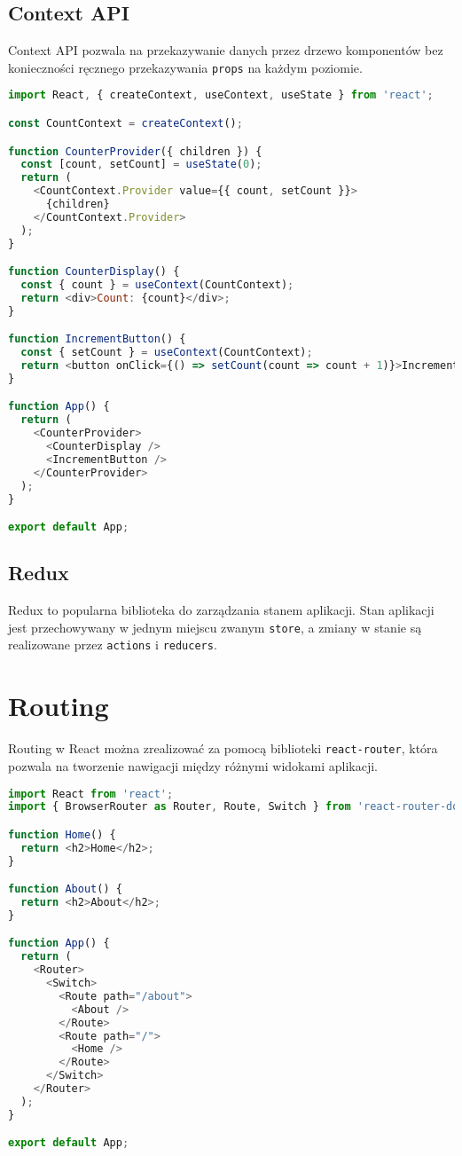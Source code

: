 \documentclass[a4paper,12pt]{article}
\begin{document}
\subsection{Context API}
Context API pozwala na przekazywanie danych przez drzewo komponentów bez konieczności ręcznego przekazywania \texttt{props} na każdym poziomie.

\begin{lstlisting}[language=JavaScript, caption=Przykład użycia Context API]
import React, { createContext, useContext, useState } from 'react';

const CountContext = createContext();

function CounterProvider({ children }) {
  const [count, setCount] = useState(0);
  return (
    <CountContext.Provider value={{ count, setCount }}>
      {children}
    </CountContext.Provider>
  );
}

function CounterDisplay() {
  const { count } = useContext(CountContext);
  return <div>Count: {count}</div>;
}

function IncrementButton() {
  const { setCount } = useContext(CountContext);
  return <button onClick={() => setCount(count => count + 1)}>Increment</button>;
}

function App() {
  return (
    <CounterProvider>
      <CounterDisplay />
      <IncrementButton />
    </CounterProvider>
  );
}

export default App;
\end{lstlisting}

\subsection{Redux}
Redux to popularna biblioteka do zarządzania stanem aplikacji. Stan aplikacji jest przechowywany w jednym miejscu zwanym \texttt{store}, a zmiany w stanie są realizowane przez \texttt{actions} i \texttt{reducers}.

\section{Routing}
Routing w React można zrealizować za pomocą biblioteki \texttt{react-router}, która pozwala na tworzenie nawigacji między różnymi widokami aplikacji.

\begin{lstlisting}[language=JavaScript, caption=Przykład użycia \texttt{react-router}]
import React from 'react';
import { BrowserRouter as Router, Route, Switch } from 'react-router-dom';

function Home() {
  return <h2>Home</h2>;
}

function About() {
  return <h2>About</h2>;
}

function App() {
  return (
    <Router>
      <Switch>
        <Route path="/about">
          <About />
        </Route>
        <Route path="/">
          <Home />
        </Route>
      </Switch>
    </Router>
  );
}

export default App;
\end{lstlisting}
\end{document}
